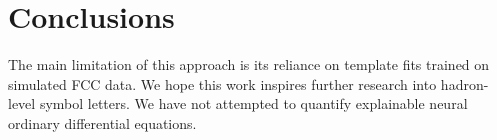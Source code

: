 \section{Conclusions}\label{sec:conclusions}

The main limitation of this approach is its reliance on template fits
trained on simulated FCC data. We hope this work inspires further
research into hadron-level symbol letters. We have not attempted to
quantify explainable neural ordinary differential equations.

